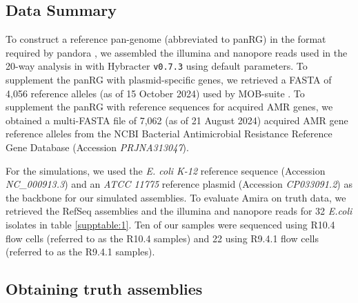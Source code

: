 \subsection*{Data Summary}

To construct a reference pan-genome (abbreviated to panRG) in the format required by pandora \cite{pandora}, we assembled the illumina and nanopore reads used in the 20-way analysis in \cite{pandora} with Hybracter \texttt{v0.7.3} \cite{Bouras2024} using default parameters. To supplement the panRG with plasmid-specific genes, we retrieved a FASTA of 4,056 reference alleles (as of 15 October 2024) used by MOB-suite \cite{10.1099/mgen.0.000206}. To supplement the panRG with reference sequences for acquired AMR genes, we obtained a multi-FASTA file of 7,062 (as of 21 August 2024) acquired AMR gene reference alleles
from the NCBI Bacterial Antimicrobial Resistance Reference Gene Database (Accession \textit{PRJNA313047}). 

For the simulations, we used the \textit{E. coli K-12} reference sequence (Accession \textit{NC\_000913.3}) and an \textit{ATCC 11775} reference plasmid (Accession \textit{CP033091.2}) as the backbone for our simulated assemblies. To evaluate Amira on truth data, we retrieved the RefSeq assemblies and the illumina and nanopore reads for 32 \textit{E.coli} isolates in table \ref{supptable:1}. Ten of our samples were sequenced using R10.4 flow cells (referred to as the R10.4 samples) and 22 using R9.4.1 flow cells (referred to as the R9.4.1 samples).

\subsection*{Obtaining truth assemblies}

